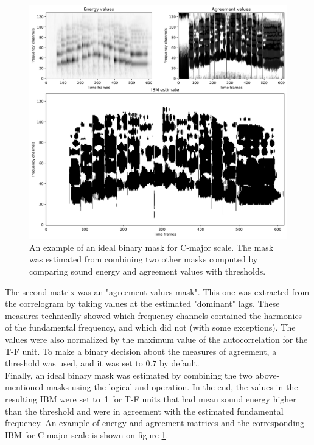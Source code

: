 \begin{figure}[t]
	\centering
	\includegraphics[width=\textwidth]{include/ibm_example}
	\caption[An example of an ideal binary mask for C-major scale]{An example of an ideal binary mask for C-major scale. The mask was estimated from combining two other masks computed by comparing sound energy and agreement values with thresholds.}
	\label{img:ibm_example}
\end{figure}

The second matrix was an "agreement values mask". This one was extracted from the correlo\-gram by taking values at the estimated "dominant" lags. These measures technically showed which frequency channels contained the harmonics of the fundamental frequency, and which did not (with some exceptions). The values were also normalized by the maximum value of the autocorrelation for the T-F unit. To make a binary decision about the measures of agreement, a threshold was used, and it was set to $0.7$ by default.\\

Finally, an ideal binary mask was estimated by combining the two above-mentioned masks using the logical-and operation. In the end, the values in the resulting IBM were set to~1 for T-F units that had mean sound energy higher than the threshold and were in agreement with the estimated fundamental frequency. An example of energy and agreement matrices and the corresponding IBM for C-major scale is shown on figure \ref{img:ibm_example}.\\

